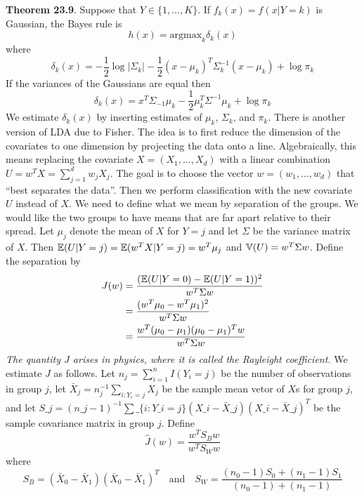 \textbf{Theorem 23.9}. Suppose that \(Y \in \{ 1, \dots, K \}\). If
\(f_{k}(x) = f(x | Y = k)\) is Gaussian, the Bayes rule is
\[
h(x) = \text{argmax}_{k} \delta_{k}(x)
\]
where
\[
\delta_{k}(x) = -\frac{1}{2} \log | \Sigma_{k} | - \frac{1}{2} (x - \mu_{k})^T \Sigma_{k}^{-1} (x - \mu_{k}) + \log \pi_{k}
\]
If the variances of the Gaussians are equal then
\[
\delta_{k}(x) = x^T \Sigma_{-1} \mu_{k} - \frac{1}{2} \mu_{k}^T \Sigma^{-1} \mu_{k} + \log \pi_{k}
\]
We estimate \(\delta_{k}(x)\) by inserting estimates of \(\mu_{k}\),
\(\Sigma_{k}\), and \(\pi_{k}\).
There is another version of LDA due to Fisher. The idea is to first
reduce the dimension of the covariates to one dimension by projecting
the data onto a line. Algebraically, this means replacing the covariate
\(X = (X_{1}, \dots, X_d)\) with a linear combination
\(U = w^T X = \sum_{j=1}^{d} w_{j} X_{j}\). The goal is to choose the vector
\(w = (w_{1}, \dots, w_d)\) that ``best separates the data''. Then we
perform classification with the new covariate \(U\) instead of \(X\).
We need to define what we mean by separation of the groups. We would
like the two groups to have means that are far apart relative to their
spread. Let \(\mu_{j}\) denote the mean of \(X\) for \(Y = j\) and let
\(\Sigma\) be the variance matrix of \(X\). Then
\(\operatorname{\mathbb{E}}(U | Y = j) = \operatorname{\mathbb{E}}(w^T X | Y = j) = w^T \mu_{j}\) and
\(\operatorname{\mathbb{V}}(U) = w^T \Sigma w\). Define the separation by
\begin{align*}
J(w) &= \frac{(\operatorname{\mathbb{E}}(U | Y = 0) - \operatorname{\mathbb{E}}(U | Y = 1))^{2}}{w^T \Sigma w} \\
&= \frac{(w^T \mu_{0} - w^T \mu_{1})^{2}}{w^T \Sigma w} \\
&= \frac{w^T (\mu_{0} - \mu_{1})(\mu_{0} - \mu_{1})^T w}{w^T \Sigma w}
\end{align*}
\emph{The quantity \(J\) arises in physics, where it is called the
Rayleight coefficient.}
We estimate \(J\) as follows. Let \(n_{j} = \sum_{i=1}^{n} I(Y_{i} = j)\) be
the number of observations in group \(j\), let
\(\bar{X}_{j} = n_{j}^{-1} \sum_{i: Y_{i} = j} X_{j}\) be the sample mean
vetor of \(X\)s for group \(j\), and let $S\_{j} = (n\_{j} - 1)^{-1}
\sum\_\{i: Y\_{i} = j\} (X\_{i} - \bar{X}\_{j})(X\_{i} -
\bar{X}\_{j})^{T} $ be the sample covariance matrix in group \(j\).
Define
\[
\hat{J}(w) = \frac{w^T S_B w}{w^T S_W w}
\]
where
\[
S_B = (\bar{X}_{0} - \bar{X}_{1}) (\bar{X}_{0} - \bar{X}_{1})^T
\quad \text{and} \quad
S_W = \frac{(n_{0} - 1) S_{0} + (n_{1} - 1) S_{1}}{(n_{0} - 1) + (n_{1} -1)}
\]

